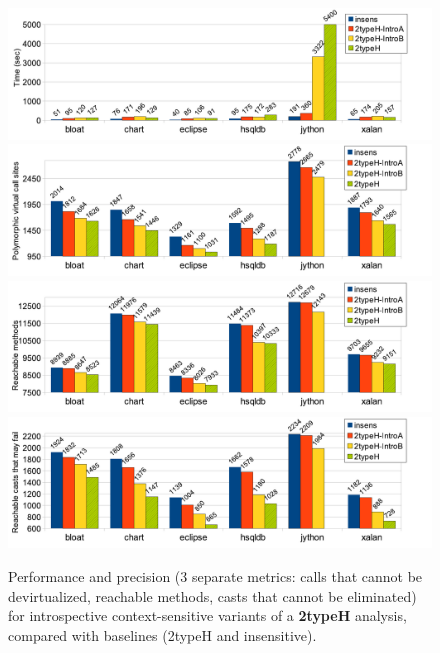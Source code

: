 \begin{figure}[h!tp]
\begin{center}
\includegraphics[scale=0.54]{assets/introspective/2typeHtime.pdf} \\
\includegraphics[scale=0.54]{assets/introspective/2typeHvcalls.pdf} \\
\includegraphics[scale=0.54]{assets/introspective/2typeHmeths.pdf} \\
\includegraphics[scale=0.54]{assets/introspective/2typeHcasts.pdf}
\end{center}
\caption{Performance and precision (3 separate metrics: calls that cannot be devirtualized, reachable methods, casts that cannot be eliminated) for introspective context-sensitive variants of a \textbf{2typeH} analysis, compared with baselines (2typeH and insensitive).}
\label{fig:introspect:2typeH-chart}
\end{figure}


